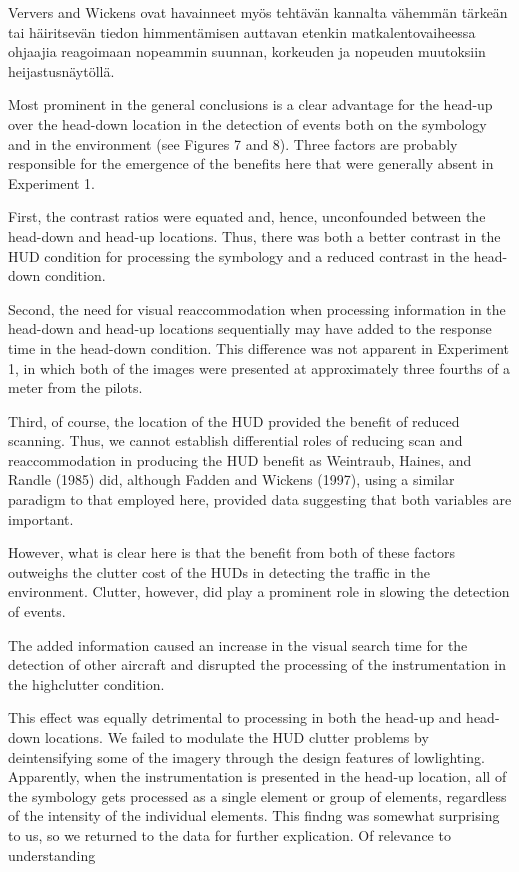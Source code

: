 \documentclass[utf8,bachelor,manualbib]{gradu3}
\begin{document}
Ververs and Wickens \citeyearpar{ververswickens1996} ovat havainneet myös tehtävän kannalta vähemmän tärkeän tai häiritsevän tiedon himmentämisen auttavan etenkin matkalentovaiheessa ohjaajia reagoimaan nopeammin suunnan, korkeuden ja nopeuden muutoksiin heijastusnäytöllä.








Most prominent in the general conclusions is a clear advantage for the head-up over the head-down location in the detection of events both on the symbology and in the environment (see Figures 7 and 8). Three factors are probably responsible for the emergence of the benefits here that were generally absent in Experiment 1.

First, the contrast ratios were equated and, hence, unconfounded between the head-down and head-up locations. Thus, there was both a better contrast in the HUD condition for processing the symbology and a reduced contrast in the head-down condition.

Second, the need for visual reaccommodation when processing information in the head-down and head-up locations sequentially may have added to the response time in the head-down condition. This difference was not apparent in Experiment 1, in which both of the images were presented at approximately three fourths of a meter from the pilots.

Third, of course, the location of the HUD provided the benefit of reduced scanning. Thus, we cannot establish differential roles of reducing scan and reaccommodation in producing the HUD benefit as Weintraub, Haines, and Randle
(1985) did, although Fadden and Wickens (1997), using a similar paradigm to that
employed here, provided data suggesting that both variables are important. 




However,
what is clear here is that the benefit from both of these factors outweighs the
clutter cost of the HUDs in detecting the traffic in the environment.
Clutter, however, did play a prominent role in slowing the detection of events.

The added information caused an increase in the visual search time for the detection of other aircraft and disrupted the processing of the instrumentation in the highclutter condition.

This effect was equally detrimental to processing in both the
head-up and head-down locations. We failed to modulate the HUD clutter problems
by deintensifying some of the imagery through the design features of lowlighting.
Apparently, when the instrumentation is presented in the head-up location, all of
the symbology gets processed as a single element or group of elements, regardless
of the intensity of the individual elements. This findng was somewhat surprising
to us, so we returned to the data for further explication. Of relevance to understanding
\end{document}
